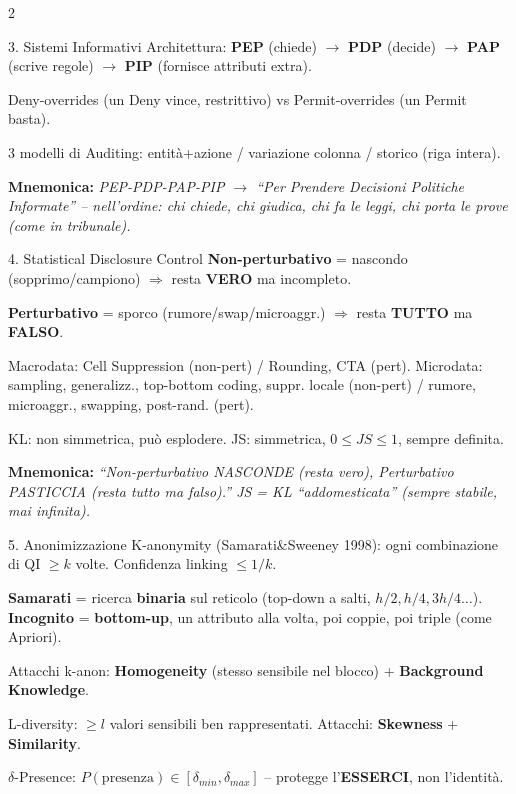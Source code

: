 \documentclass[a4paper,10pt]{article}
\newcommand{\mnem}[1]{{\color{orange!70!black}\textbf{Mnemonica:} \textit{#1}}}
\begin{document}
\begin{multicols}{2}
\begin{area}{3. Sistemi Informativi}
Architettura: \textbf{PEP} (chiede) $\to$ \textbf{PDP} (decide) $\to$ \textbf{PAP} (scrive regole) $\to$ \textbf{PIP} (fornisce attributi extra).

Deny-overrides (un Deny vince, restrittivo) vs Permit-overrides (un Permit basta).

3 modelli di Auditing: entit\`{a}+azione / variazione colonna / storico (riga intera).

\mnem{PEP-PDP-PAP-PIP $\to$ \emph{``Per Prendere Decisioni Politiche Informate''} -- nell'ordine: chi chiede, chi giudica, chi fa le leggi, chi porta le prove (come in tribunale).}
\end{area}

\begin{area}{4. Statistical Disclosure Control}
\textbf{Non-perturbativo} = nascondo (sopprimo/campiono) $\Rightarrow$ resta \textbf{VERO} ma incompleto.

\textbf{Perturbativo} = sporco (rumore/swap/microaggr.) $\Rightarrow$ resta \textbf{TUTTO} ma \textbf{FALSO}.

Macrodata: Cell Suppression (non-pert) / Rounding, CTA (pert).
Microdata: sampling, generalizz., top-bottom coding, suppr. locale (non-pert) / rumore, microaggr., swapping, post-rand. (pert).

KL: non simmetrica, pu\`{o} esplodere. JS: simmetrica, $0\le JS\le1$, sempre definita.

\mnem{``Non-perturbativo NASCONDE (resta vero), Perturbativo PASTICCIA (resta tutto ma falso).'' JS = KL ``addomesticata'' (sempre stabile, mai infinita).}
\end{area}

\begin{area}{5. Anonimizzazione}
K-anonymity (Samarati\&Sweeney 1998): ogni combinazione di QI $\ge k$ volte. Confidenza linking $\le 1/k$.

\textbf{Samarati} = ricerca \textbf{binaria} sul reticolo (top-down a salti, $h/2,h/4,3h/4\dots$).
\textbf{Incognito} = \textbf{bottom-up}, un attributo alla volta, poi coppie, poi triple (come Apriori).

Attacchi k-anon: \textbf{Homogeneity} (stesso sensibile nel blocco) + \textbf{Background Knowledge}.

L-diversity: $\ge l$ valori sensibili ben rappresentati. Attacchi: \textbf{Skewness} + \textbf{Similarity}.

$\delta$-Presence: $P(\text{presenza})\in[\delta_{min},\delta_{max}]$ -- protegge l'\textbf{ESSERCI}, non l'identit\`{a}.


\end{area}
\end{multicols}
\end{document}

